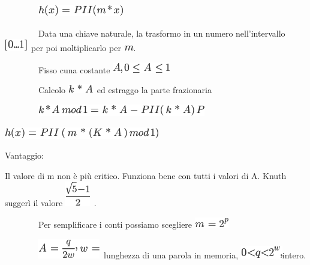 \documentclass{article}
\begin{document}
{~~~~~~~~}\includegraphics{images/image259.png}

{}

{~~~~~~~~Data una chiave naturale, la trasformo in un numero
nell'intervallo }\includegraphics{images/image260.png}{~per poi
moltiplicarlo per }\includegraphics{images/image235.png}{.}

{~~~~~~~~Fisso cuna costante }\includegraphics{images/image261.png}

{~~~~~~~~Calcolo }\includegraphics{images/image262.png}{~ed estraggo la
parte frazionaria}

{~~~~~~~~}\includegraphics{images/image263.png}

\includegraphics{images/image264.png}

{}

{Vantaggio:}

{Il valore di m non è più critico. Funziona bene con tutti i valori di
A. Knuth suggerì il valore }\includegraphics{images/image265.png}{~.}

{}

{~~~~~~~~Per semplificare i conti possiamo scegliere
}\includegraphics{images/image266.png}

{~~~~~~~~}\includegraphics{images/image267.png}{~lunghezza di una parola
in memoria, }\includegraphics{images/image268.png}{intero.}
\end{document}
